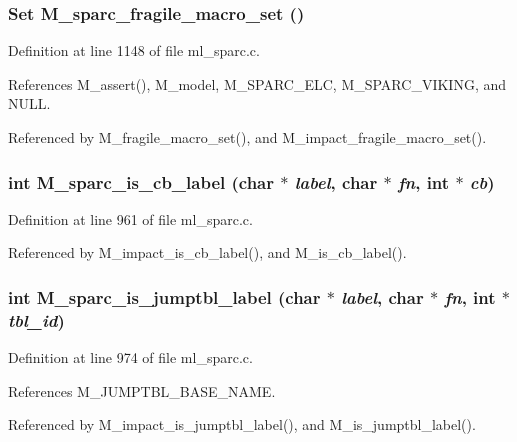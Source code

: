 \subsubsection{\setlength{\rightskip}{0pt plus 5cm}\bf{Set} M\_\-sparc\_\-fragile\_\-macro\_\-set ()}\label{ml__sparc_8c_26a0ab8e51c36857e8dbb8349e3fa370}




Definition at line 1148 of file ml\_\-sparc.c.

References M\_\-assert(), M\_\-model, M\_\-SPARC\_\-ELC, M\_\-SPARC\_\-VIKING, and NULL.

Referenced by M\_\-fragile\_\-macro\_\-set(), and M\_\-impact\_\-fragile\_\-macro\_\-set().
\subsubsection{\setlength{\rightskip}{0pt plus 5cm}int M\_\-sparc\_\-is\_\-cb\_\-label (char $\ast$ {\em label}, char $\ast$ {\em fn}, int $\ast$ {\em cb})}\label{ml__sparc_8c_182aa66ec925aabc0d4718fe79941095}




Definition at line 961 of file ml\_\-sparc.c.

Referenced by M\_\-impact\_\-is\_\-cb\_\-label(), and M\_\-is\_\-cb\_\-label().
\subsubsection{\setlength{\rightskip}{0pt plus 5cm}int M\_\-sparc\_\-is\_\-jumptbl\_\-label (char $\ast$ {\em label}, char $\ast$ {\em fn}, int $\ast$ {\em tbl\_\-id})}\label{ml__sparc_8c_f542dde0a56d19c388a6e4562242364d}




Definition at line 974 of file ml\_\-sparc.c.

References M\_\-JUMPTBL\_\-BASE\_\-NAME.

Referenced by M\_\-impact\_\-is\_\-jumptbl\_\-label(), and M\_\-is\_\-jumptbl\_\-label().
